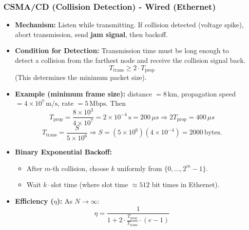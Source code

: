 \subsubsection{CSMA/CD (Collision Detection) - Wired (Ethernet)}
\begin{itemize}
    \item \textbf{Mechanism:} Listen while transmitting. If collision detected (voltage spike), abort transmission, send \textbf{jam signal}, then backoff.
    \item \textbf{Condition for Detection:} Transmission time must be long enough to detect a collision from the farthest node and receive the collision signal back.
    \[ T_{\text{trans}} \ge 2 \cdot T_{\text{prop}} \]
    (This determines the minimum packet size).
	\item \textbf{Example (minimum frame size):} distance $=8\,\mathrm{km}$, propagation speed $=4\times 10^7\,\mathrm{m/s}$, rate $=5\,\mathrm{Mbps}$. Then
	\[ T_{\text{prop}}=\frac{8\times 10^3}{4\times 10^7}=2\times 10^{-4}\,\mathrm{s}=200\,\mu s \Rightarrow 2T_{\text{prop}}=400\,\mu s \]
	\[ T_{\text{trans}}=\frac{S}{5\times 10^6} \Rightarrow S=(5\times 10^6)(4\times 10^{-4})=2000\,\text{bytes}. \]
    \item \textbf{Binary Exponential Backoff:}
    \begin{itemize}
        \item After $m$-th collision, choose $k$ uniformly from $\{0, \ldots, 2^m-1\}$.
        \item Wait $k \cdot \text{slot time}$ (where slot time $\approx 512$ bit times in Ethernet).
    \end{itemize}
    \item \textbf{Efficiency ($\eta$):} As $N \to \infty$:
    \[ \eta = \frac{1}{1 + 2 \cdot \frac{T_{\text{prop}}}{T_{\text{trans}}} \cdot (e-1)} \]
\end{itemize}

